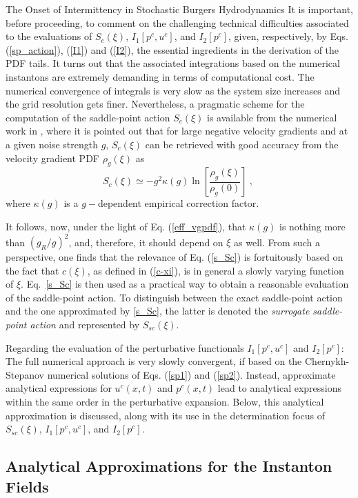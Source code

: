 \begin{chapter}{The Onset of Intermittency in Stochastic Burgers Hydrodynamics}
It is important, before proceeding, to comment on the challenging technical difficulties associated to the evaluations of $S_c(\xi)$,  $I_1 [p^c,u^c]$, and $I_2 [p^c]$, given, respectively, by Eqs. (\ref{sp_action}), (\ref{I1}) and (\ref{I2}), the essential ingredients in the derivation of the PDF tails. It turns out that the associated integrations based on the numerical instantons are extremely demanding in terms of computational cost. The numerical convergence of integrals is very slow as the system size increases and the grid resolution gets finer.
Nevertheless, a pragmatic scheme for the computation of the saddle-point action $S_c(\xi)$ is available from the numerical work in \textcite{grafke2015relevance}, where it is pointed out that for large negative velocity gradients and at a given noise strength $g$, $S_c(\xi)$ can be retrieved with good accuracy from the velocity gradient PDF $\rho_g(\xi)$ as
\begin{equation}
S_c(\xi) \simeq - g^2\kappa(g) \ln \left [ \frac{\rho_g(\xi)}{\rho_g(0)} \right ] \ , \ \label{s_Sc}
\end{equation}
where $\kappa(g)$ is a $g-$dependent empirical correction factor.

It follows, now, under the light of Eq. (\ref{eff_vgpdf}), that $\kappa(g)$ is nothing more than $(g_R/g)^2$, and, therefore, it should depend on $\xi$ as well.  From such a perspective, one finds that the relevance of Eq. (\ref{s_Sc}) is fortuitously based on the fact that $c(\xi)$, as defined in (\ref{c-xi}), is in general a slowly varying function of $\xi$. Eq.~\eqref{s_Sc} is then used as a practical way to obtain a reasonable evaluation of the saddle-point action.
To distinguish between the exact saddle-point action and the one approximated by \eqref{s_Sc}, the latter is denoted the \textit{surrogate saddle-point action} and represented by $S_{sc}(\xi)$.

Regarding the evaluation of the perturbative functionals $I_1 [p^c,u^c]$ and $I_2 [p^c]$: The full numerical approach is very slowly convergent, if based on the Chernykh-Stepanov numerical solutions of Eqs. (\ref{sp1}) and (\ref{sp2}). Instead, approximate analytical expressions for $u^c(x,t)$ and $p^c(x,t)$ lead to analytical expressions within the same order in the perturbative expansion. Below, this analytical approximation is discussed, along with its use in the determination focus of $S_{sc}(\xi)$, $I_1 [p^c,u^c]$, and $I_2 [p^c]$.

\subsection{Analytical Approximations for the Instanton Fields}


\end{chapter}
